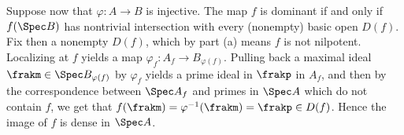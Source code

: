 \begin{homework}[e]
\begin{prf}
\begin{enumerate}[(a)]
				Suppose now that $\varphi:A\to B$ is injective. The map $f$ is dominant if and only if $f(\Spec B)$ has nontrivial intersection with every (nonempty) basic open $D(f)$. Fix then a nonempty $D(f)$, which by part (a) means $f$ is not nilpotent. Localizing at $f$ yields a map $\varphi_f:A_f \to B_{\varphi(f)}$. Pulling back a maximal ideal $\frakm \in \Spec B_{\varphi(f)}$ by $\varphi_f$ yields a prime ideal in $\frakp$ in $A_f$, and then by the correspondence between $\Spec A_f$ and primes in $\Spec A$ which do not contain $f$, we get that $f(\frakm) = \varphi^{-1}(\frakm) = \frakp \in D(f)$. Hence the image of $f$ is dense in $\Spec A$.
		\end{enumerate}
	\end{prf}
\end{homework}

